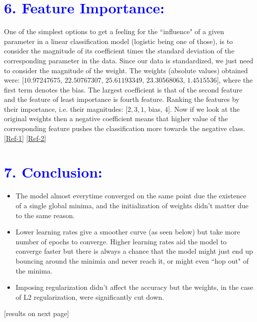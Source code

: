 \documentclass[a4paper,10pt,twoside]{article}
\begin{document}
\section*{\textcolor{blue}{6. Feature Importance:}}
One of the simplest options to get a feeling for the ``influence" of a given parameter in a linear classification model (logistic being one of those), is to consider the magnitude of its coefficient times the standard deviation of the corresponding parameter in the data. Since our data is standardized, we just need to consider the magnitude of the weight. The weights (absolute values) obtained were: [$10.97247675$, $22.50767307$, $25.61193349$, $23.30568063$, $1.4515536$], where the first term denotes the bias. The largest coefficient is that of the second feature and the feature of least importance is fourth feature. Ranking the features by their importance, i.e. their magnitudes: [$2, 3, 1$, bias, $4$]. Now if we look at the original weights then a negative coefficient means that higher value of the corresponding feature pushes the classification more towards the negative class. 
\href{https://stackoverflow.com/questions/51462979/how-to-get-feature-importance-in-logistic-regression-using-weights}{[Ref-1]}
\href{https://stackoverflow.com/questions/34052115/how-to-find-the-importance-of-the-features-for-a-logistic-regression-model}{[Ref-2]}


\section*{\textcolor{blue}{7. Conclusion:}}
\begin{itemize}
\item{The model almost everytime converged on the same point due the existence of a single global minima, and the initialization of weights didn't matter due to the same reason.}
\item{Lower learning rates give a smoother curve (as seen below) but take more number of epochs to converge. Higher learning rates aid the model to converge faster but there is always a chance that the model might just end up bouncing around the minimia and never reach it, or might even ``hop out" of the minima.}
\item{Imposing regularization didn't affect the accuracy but the weights, in the case of L2 regularization, were significantly cut down.}
\end{itemize}
[results on next page]

\newpage
\onecolumn
\end{document}
